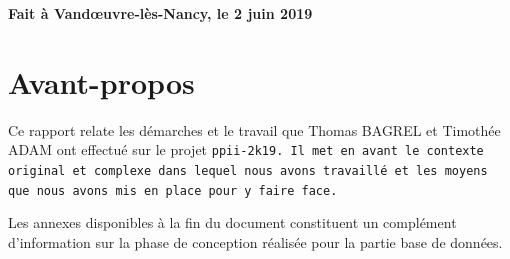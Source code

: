 \documentclass[a4paper, 11pt, twoside]{book}
\makeatletter
\def\cleardoublepage{\clearpage\if@twoside \ifodd\c@page\else
\thispagestyle{empty}%
\hbox{}\newpage\thispagestyle{empty}\if@twocolumn\hbox{}\newpage\thispagestyle{empty}\fi\fi\fi}
\makeatother
\begin{document}
\vfill{}

\hspace{7cm}\begin{minipage}{7cm}
\bf{Fait à Vand\oe{}uvre-lès-Nancy, le 2 juin 2019}

\vspace{2cm}

\phantom{<signature>}
\end{minipage}
\clearpage{}


\section*{Avant-propos}

Ce rapport relate les démarches et le travail que Thomas BAGREL et Timothée ADAM ont effectué sur le projet  \tt{ppii-2k19}. Il met en avant le contexte original et complexe dans lequel nous avons travaillé et les moyens que nous avons mis en place pour y faire face.

Les annexes disponibles à la fin du document constituent un complément d'information sur la phase de conception réalisée pour la partie base de données.

\hspace{3cm}


\tableofcontents{}
\newpage\hbox{}\thispagestyle{empty}\cleardoublepage{}

\mainmatter
\pagestyle{fancy}
\fancyhf{}

\renewcommand*{\chaptermark}[1]{%
  \markboth{%
    \bfseries%
    \ifnum\value{chapter}>0 %
      \chaptername~\thechapter.~%
    \fi%
    #1%
  }{}
}
\renewcommand*{\sectionmark}[1]{%
  \markright{%
    \ifnum\value{chapter}>0 \ifnum\value{section}>0 %
      \thesection.~%
    \fi\fi
    #1%
  }%
}%

\lhead[\leftmark]{}
\chead{}
\rhead[]{\rightmark}

\lfoot{}
\cfoot{\thepage}
\rfoot{}
\end{document}
